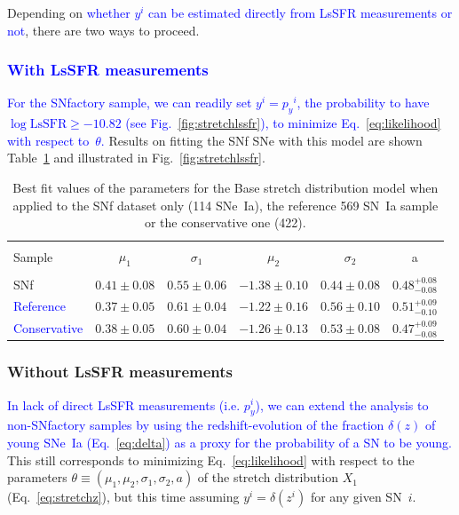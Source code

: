 \documentclass[]{aa} %
\newcommand{\mr}[1]{{\textcolor[rgb]{0.60,0.10,0.6}{#1}}}
\newcommand{\yc}[1]{{\textcolor{blue}{#1}}}
\begin{document}
Depending on \yc{whether $y^i$ can be 
estimated directly from LsSFR measurements or not}, there are two ways to proceed.

\subsubsection{\yc{With LsSFR measurements}}
\label{sec:modelpy}

\yc{For the SNfactory sample, we can readily set $y^i = p_y{}^i$, the
probability to have $\log \mathrm{LsSFR} \geq -10.82$ (see Fig.~\ref{fig:stretchlssfr}),
to minimize Eq.~\ref{eq:likelihood} with respect to~$\theta$.}
\mr{Results on fitting the SNf SNe with this model are shown
Table~\ref{tab:modelresults} and illustrated in Fig.~\ref{fig:stretchlssfr}.}

\begin{table}
    \centering
    \caption{Best fit values of the parameters for the Base stretch distribution
    model when applied to the SNf dataset only (114 SNe~Ia), the reference 569
SN~Ia sample or the conservative one (422).}
    \label{tab:modelresults}
    \begin{tabular}{l c c c c c}
    \hline\hline\\[-0.8em]
        Sample & $\mu_1$  & $\sigma_1$ &$\mu_2$  & $\sigma_2$ & a \\[0.15em]
        \hline\\[-0.8em]
        SNf & $0.41 \pm 0.08$  & $0.55 \pm 0.06$ & $-1.38 \pm 0.10$ & $0.44 \pm 0.08$ & $0.48^{+0.08}_{-0.08}$ \\[0.15em]
        \yc{Reference} & $0.37 \pm 0.05$  & $0.61 \pm 0.04$ & $-1.22 \pm 0.16$ & $0.56 \pm 0.10$ & $0.51^{+0.09}_{-0.10}$ \\[0.15em]
        \yc{Conservative} & $0.38 \pm 0.05$  & $0.60 \pm 0.04$ & $-1.26 \pm 0.13$ & $0.53 \pm 0.08$ & $0.47^{+0.09}_{-0.08}$ \\[0.15em]
        \hline
    \end{tabular}
\end{table}

\subsubsection{Without LsSFR measurements}
\label{sec:modelnopy}

\yc{In lack of direct LsSFR measurements (i.e. $p_y^i$), we can extend the analysis to 
non-SNfactory samples by using the redshift-evolution of the fraction $\delta(z)$ 
of young SNe~Ia (Eq.~\ref{eq:delta}) as a proxy for the probability of a 
SN to be young.} This still corresponds to minimizing Eq.~\ref{eq:likelihood} 
with respect to the parameters 
$\theta\equiv(\mu_1, \mu_2, \sigma_1, \sigma_2, a)$ 
of the stretch distribution $X_1$ (Eq.~\ref{eq:stretchz}), 
but this time assuming $y^i = \delta(z^i)$ for any given SN~$i$. 
\end{document}
